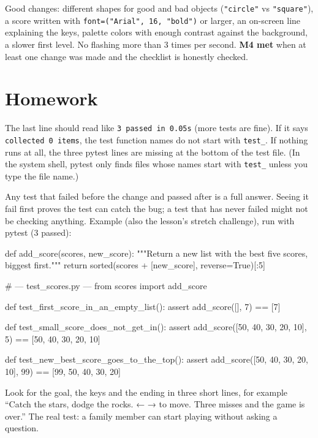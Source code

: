 \begin{answer}
Good changes: different shapes for good and bad objects (\texttt{"circle"} vs \texttt{"square"}),
a score written with \texttt{font=("Arial", 16, "bold")} or larger, an on-screen line explaining the
keys, palette colors with enough contrast against the background, a slower first level. No
flashing more than 3 times per second. \textbf{M4 met} when at least one change was made and the
checklist is honestly checked.
\end{answer}

\section{Homework}
\begin{answer}
The last line should read like \texttt{3 passed in 0.05s} (more tests are fine). If it says
\texttt{collected 0 items}, the test function names do not start with \texttt{test\_}. If nothing
runs at all, the three pytest lines are missing at the bottom of the test file. (In the system shell,
pytest only finds files whose names start with \texttt{test\_} unless you type the file name.)
\end{answer}

\begin{answer}
Any test that failed before the change and passed after is a full answer. Seeing it fail first proves
the test can catch the bug; a test that has never failed might not be checking anything. Example
(also the lesson's stretch challenge), run with pytest (3 passed):
\begin{pycode}
def add_score(scores, new_score):
    """Return a new list with the best five scores, biggest first."""
    return sorted(scores + [new_score], reverse=True)[:5]

# --- test_scores.py ---
from scores import add_score

def test_first_score_in_an_empty_list():
    assert add_score([], 7) == [7]

def test_small_score_does_not_get_in():
    assert add_score([50, 40, 30, 20, 10], 5) == [50, 40, 30, 20, 10]

def test_new_best_score_goes_to_the_top():
    assert add_score([50, 40, 30, 20, 10], 99) == [99, 50, 40, 30, 20]
\end{pycode}
\end{answer}

\begin{answer}
Look for the goal, the keys and the ending in three short lines, for example \enquote{Catch the
stars, dodge the rocks. ← → to move. Three misses and the game is over.} The real test: a family
member can start playing without asking a question.
\end{answer}
